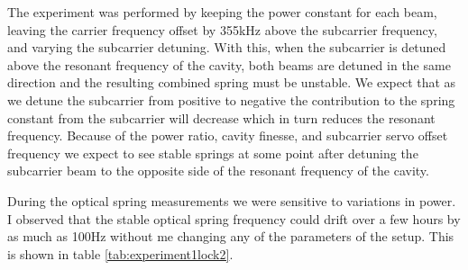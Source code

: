 The experiment was performed by keeping the power constant for each beam,
leaving the carrier frequency offset by 355kHz above the subcarrier frequency,
and varying the subcarrier detuning.
With this, when the subcarrier is detuned above the resonant frequency of the
cavity, both beams are detuned in the same direction and the resulting
combined spring must be unstable.
We expect that as we detune the subcarrier from positive to negative the
contribution to the spring constant from the subcarrier will decrease which
in turn reduces the resonant frequency.
Because of the power ratio, cavity finesse, and subcarrier servo offset
frequency we expect to see stable springs at some point after detuning the
subcarrier beam to the opposite side of the resonant frequency of the cavity.

During the optical spring measurements we were sensitive to variations in
power.
I observed that the stable optical spring frequency could drift over a few
hours by as much as 100Hz without me changing any of the parameters of the
setup.
This is shown in table \ref{tab:experiment1lock2}.

